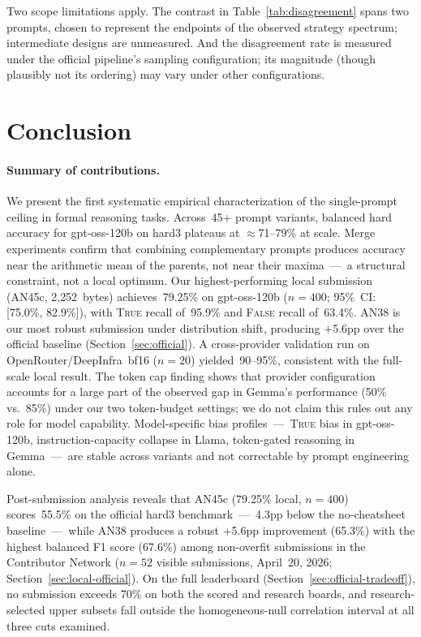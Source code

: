 \documentclass[11pt]{article}
\begin{document}
Two scope limitations apply. The contrast in
Table~\ref{tab:disagreement} spans two prompts, chosen to represent
the endpoints of the observed strategy spectrum; intermediate designs
are unmeasured. And the disagreement rate is measured under the
official pipeline's sampling configuration; its magnitude (though
plausibly not its ordering) may vary under other configurations.

\section{Conclusion}
\label{sec:conclusion}

\paragraph{Summary of contributions.}
We present the first systematic empirical characterization of the
single-prompt ceiling in formal reasoning tasks. Across~45+ prompt
variants, balanced hard accuracy for gpt-oss-120b on hard3 plateaus at
$\approx$71--79\% at scale. Merge experiments confirm that combining
complementary prompts produces accuracy near the arithmetic mean of the
parents, not near their maxima~---~a structural constraint, not a local
optimum. Our highest-performing local submission (AN45c, 2{,}252~bytes)
achieves~79.25\% on gpt-oss-120b ($n=400$; 95\%~CI: [75.0\%, 82.9\%]),
with \textsc{True} recall of~95.9\% and \textsc{False} recall of~63.4\%.
AN38 is our most robust submission under distribution shift, producing
$+$5.6pp over the official baseline (Section~\ref{sec:official}). A
cross-provider validation run on OpenRouter/DeepInfra~bf16 ($n=20$)
yielded~90--95\%, consistent with the full-scale local result. The token
cap finding shows that provider configuration accounts for a large part of
the observed gap in Gemma's performance (50\% vs.~85\%) under our two
token-budget settings; we do not claim this rules out any role for model
capability.
Model-specific bias profiles~---~\textsc{True} bias in gpt-oss-120b,
instruction-capacity collapse in Llama, token-gated reasoning in
Gemma~---~are stable across variants and not correctable by prompt
engineering alone.

Post-submission analysis reveals that AN45c (79.25\% local,
$n=400$) scores~55.5\% on the official hard3 benchmark~---~4.3pp below
the no-cheatsheet baseline~---~while AN38 produces a robust $+$5.6pp
improvement (65.3\%) with the highest balanced F1 score (67.6\%) among
non-overfit submissions in the Contributor Network ($n=52$ visible
submissions, April~20, 2026; Section~\ref{sec:local-official}). On the
full leaderboard (Section~\ref{sec:official-tradeoff}), no submission
exceeds 70\% on both the scored and research boards, and
research-selected upper subsets fall outside the homogeneous-null
correlation interval at all three cuts examined.
\end{document}
